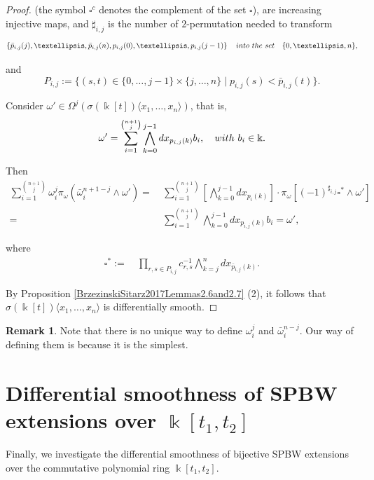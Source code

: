\documentclass{amsart}
\theoremstyle{definition}
\newtheorem{remark}[theorem]{Remark}
\theoremstyle{remark}
\numberwithin{equation}{section}
\begin{document}
\begin{proof}
(the symbol $\square^c$ denotes the complement of the set $\square$), are increasing injective maps, and $\sharp_{i,j}$ is the number of $2$-permutation needed to transform 
\[
\left\{\bar{p}_{i,j}(j),\ldots, \bar{p}_{i,j}(n), p_{i,j}(0), \ldots, p_{i,j}(j-1)\right\} \quad {\rm into\ the\ set} \quad \{0, \ldots, n\},
\]

and 
\[
P_{i,j} :=\{(s, t) \in \{0, \ldots, j-1\}\times\{j, \ldots, n\} \mid p_{i,j}(s)< \bar{p}_{i,j}(t)\}.
\]

Consider $\omega' \in \Omega^j(\sigma(\Bbbk[t])\langle x_1,\ldots, x_n\rangle)$, that is,  
\begin{align*}
\omega' =\sum_{i=1}^{\binom{n+1}{j}}\bigwedge_{k=0}^{j-1}dx_{p_{i,j}(k)}b_i, \quad {\rm with} \  b_i \in \Bbbk.
\end{align*}

Then
\begin{align*}
 \sum_{i=1}^{\binom{n+1}{j}}\omega_{i}^{j}\pi_{\omega}(\bar{\omega}_i^{n+1-j}\wedge \omega') = &\ \sum_{i=1}^{\binom{n+1}{j}}\left[\bigwedge_{k=0}^{j-1}dx_{p_i(k)}\right] \cdot  \pi_{\omega} \left[(-1)^{\sharp_{i,j}} \square^{*} \wedge \omega'\right] \\
 = &\ \displaystyle \sum_{i=1}^{\binom{n+1}{j}}\bigwedge_{k=0}^{j-1}dx_{p_{i,j}(k)}b_i =  \omega',
\end{align*}

where 
\begin{align*}
    \square^{*} := &\ \prod_{r,s\in P_{i,j}}c_{r,s}^{-1} \bigwedge_{k=j}^{n}dx_{\bar{p}_{i,j}(k)}.
\end{align*}

By Proposition \ref{BrzezinskiSitarz2017Lemmas2.6and2.7} (2), it follows that $\sigma(\Bbbk[t])\langle x_1,\dotsc, x_n\rangle$ is differentially smooth.
\end{proof}

\begin{remark} 
Note that there is no unique way to define $\omega_i^j$ and $\bar{\omega}_i^{n-j}$. Our way of defining them is because it is the simplest.
\end{remark}


\section{Differential smoothness of SPBW extensions over \texorpdfstring{$\Bbbk[t_1, t_2]$}{Lg}}\label{DICSPBWKt1t2}

Finally, we investigate the differential smoothness of bijective SPBW extensions over the commutative polynomial ring $\Bbbk[t_1, t_2]$.
\end{document}
